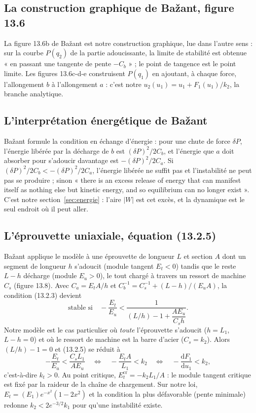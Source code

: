 \documentclass[11pt,a4paper]{article}
\newcommand{\dd}{\mathrm{d}}
\begin{document}
\subsection{La construction graphique de Bažant, figure 13.6}
La figure 13.6b de Bažant est notre construction graphique, lue dans l'autre sens : sur la
courbe $P(q_2)$ de la partie adoucissante, la limite de stabilité est obtenue « en passant une
tangente de pente $-C_b$ » ; le point de tangence est le point limite. Les figures 13.6c-d-e
construisent $P(q_1)$ en ajoutant, à chaque force, l'allongement $b$ à l'allongement $a$ :
c'est notre $u_2(u_1) = u_1 + F_1(u_1)/k_2$, la branche analytique.

\subsection{L'interprétation énergétique de Bažant}
Bažant formule la condition en échange d'énergie : pour une chute de force $\delta P$,
l'énergie libérée par la décharge de $b$ est $(\delta P)^2/2C_b$, et l'énergie que $a$ doit
absorber pour s'adoucir davantage est $-(\delta P)^2/2C_a$. Si $(\delta P)^2/2C_b < -(\delta P)^2/2C_a$,
l'énergie libérée ne suffit pas et l'instabilité ne peut pas se produire ; sinon « there is an
excess release of energy that can manifest itself as nothing else but kinetic energy, and so
equilibrium can no longer exist ». C'est notre section~\ref{sec:energie} : l'aire $|W|$ est
cet excès, et la dynamique est le seul endroit où il peut aller.

\subsection{L'éprouvette uniaxiale, équation (13.2.5)}
Bažant applique le modèle à une éprouvette de longueur $L$ et section $A$ dont un segment de
longueur $h$ s'adoucit (module tangent $E_t < 0$) tandis que le reste $L-h$ décharge
(module $E_u > 0$), le tout chargé à travers un ressort de machine $C_s$ (figure 13.8). Avec
$C_a = E_tA/h$ et $C_b^{-1} = C_s^{-1} + (L-h)/(E_uA)$, la condition (13.2.3) devient
\begin{equation}
  \text{stable si}\quad -\frac{E_t}{E_u} < \frac{1}{(L/h) - 1 + \dfrac{AE_u}{C_sh}} .
  \tag{13.2.5}
\end{equation}
Notre modèle est le cas particulier où \emph{toute} l'éprouvette s'adoucit ($h = L_1$,
$L - h = 0$) et où le ressort de machine est la barre d'acier ($C_s = k_2$). Alors
$(L/h) - 1 = 0$ et (13.2.5) se réduit à
\begin{equation}
  -\frac{E_t}{E_u} < \frac{C_sL_1}{AE_u}
  \quad\Longleftrightarrow\quad
  -\frac{E_tA}{L_1} < k_2
  \quad\Longleftrightarrow\quad
  -\frac{\dd F_1}{\dd u_1} < k_2 ,
\end{equation}
c'est-à-dire $k_t > 0$. Au point critique, $E_t^{\text{cr}} = -k_2L_1/A$ : le module tangent
critique est fixé par la raideur de la chaîne de chargement. Sur notre loi,
$E_t = (E_1)e^{-x^2}(1-2x^2)$ et la condition la plus défavorable (pente minimale) redonne
$k_2 < 2e^{-3/2}k_1$ pour qu'une instabilité existe.
\end{document}
